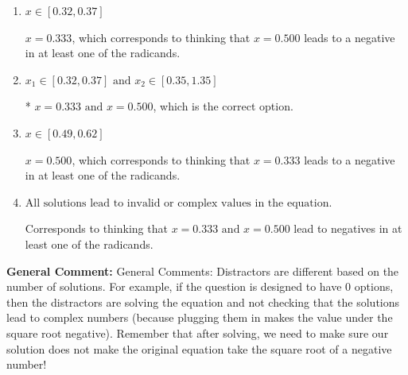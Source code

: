 \documentclass{extbook}[14pt]
\begin{document}
\begin{enumerate}
{\begin{enumerate}[label=\Alph*.]
$x = -0.500 \text{ and } x = -0.333$, which are the negative or absolute values of the values you would have gotten by solving the equation correctly.
\item \( x \in [0.32,0.37] \)

$x = 0.333$, which corresponds to thinking that $x = 0.500$ leads to a negative in at least one of the radicands.
\item \( x_1 \in [0.32, 0.37] \text{ and } x_2 \in [0.35,1.35] \)

* $x = 0.333 \text{ and } x = 0.500$, which is the correct option.
\item \( x \in [0.49,0.62] \)

$x = 0.500$, which corresponds to thinking that $x = 0.333$ leads to a negative in at least one of the radicands.
\item \( \text{All solutions lead to invalid or complex values in the equation.} \)

Corresponds to thinking that $x = 0.333 \text{ and } x = 0.500$ lead to negatives in at least one of the radicands.
\end{enumerate}

\textbf{General Comment:} General Comments: Distractors are different based on the number of solutions. For example, if the question is designed to have 0 options, then the distractors are solving the equation and not checking that the solutions lead to complex numbers (because plugging them in makes the value under the square root negative). Remember that after solving, we need to make sure our solution does not make the original equation take the square root of a negative number!
}
\end{enumerate}
\end{document}
